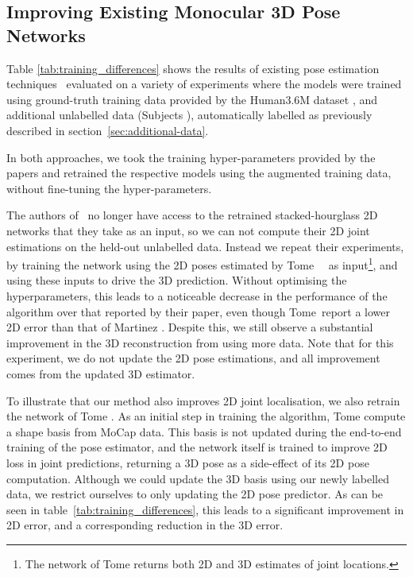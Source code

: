 \documentclass[10pt,twocolumn,letterpaper]{article}
\begin{document}
\subsection{Improving Existing Monocular 3D Pose Networks}
Table \ref{tab:training_differences} shows the results of existing pose
estimation techniques~\cite{tome2017lifting,martinez2017simple} evaluated on a
variety of experiments where the models were trained using ground-truth
training data provided by the Human3.6M dataset \cite{ionescu2014human3}, and
additional unlabelled data (Subjects ), automatically
labelled as previously described in section~\ref{sec:additional-data}.

In both approaches, we took the training hyper-parameters provided by the papers
and retrained the respective models using the augmented training data, without
fine-tuning the hyper-parameters.

The authors of~\cite{martinez2017simple} no longer have access to the retrained
stacked-hourglass 2D networks that they take as an input, so we can not
compute their 2D joint estimations on the held-out unlabelled data. Instead we
repeat their experiments, by training the network using the 2D poses estimated by
Tome~\etal~\cite{tome2017lifting} as input\footnote{The network of Tome \etal
  \cite{tome2017lifting} returns both 2D and 3D estimates of joint locations.},
and using these inputs to drive the 3D prediction. Without optimising the hyperparameters, this
leads to a noticeable decrease in the performance of the algorithm over that
reported by their paper, even though Tome~\etal report a lower 2D error than
that of  Martinez \etal. Despite this, we still observe a
substantial improvement in the 3D reconstruction from using more data. Note that
for this experiment, we do not update the 2D pose estimations, and all
improvement comes from the updated 3D estimator.

To illustrate that our method also improves  2D joint
localisation, we also retrain the network of Tome \etal. As an initial step in
training the algorithm, Tome \etal  compute a shape basis from MoCap data.
This basis is not updated during the end-to-end training of the pose estimator,
and the network itself is trained to improve 2D loss in joint predictions,
returning a 3D pose as a side-effect of its 2D pose computation. Although we
could update the 3D basis using our newly labelled data, we 
restrict ourselves to only updating the 2D pose predictor. As can be seen in
table~\ref{tab:training_differences}, this leads to a significant improvement in
2D error, and a corresponding reduction in the 3D error.
\end{document}

